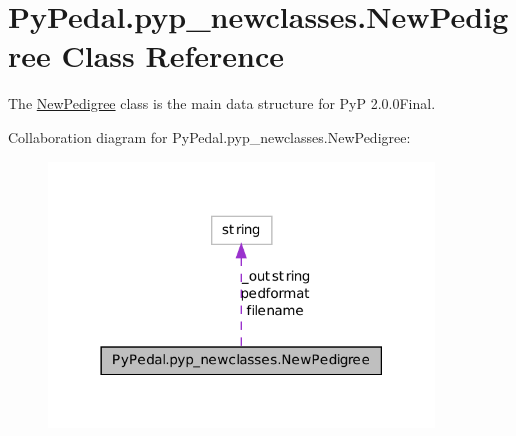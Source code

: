 \hypertarget{classPyPedal_1_1pyp__newclasses_1_1NewPedigree}{
\section{PyPedal.pyp\_\-newclasses.NewPedigree Class Reference}
\label{classPyPedal_1_1pyp__newclasses_1_1NewPedigree}
}


The \hyperlink{classPyPedal_1_1pyp__newclasses_1_1NewPedigree}{NewPedigree} class is the main data structure for PyP 2.0.0Final.  




Collaboration diagram for PyPedal.pyp\_\-newclasses.NewPedigree:\nopagebreak
\begin{figure}[H]
\begin{center}
\leavevmode
\includegraphics[width=290pt]{classPyPedal_1_1pyp__newclasses_1_1NewPedigree__coll__graph}
\end{center}
\end{figure}
